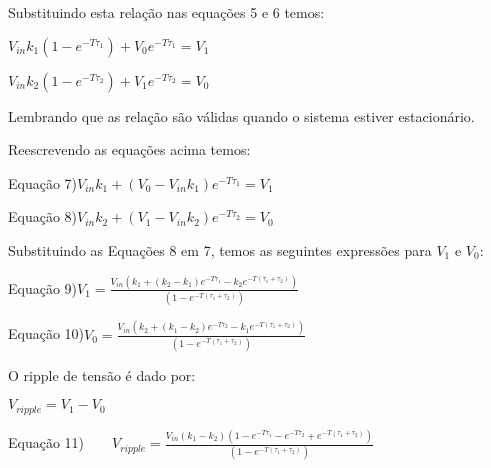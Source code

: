 \documentclass{article}
\begin{document}
Substituindo esta rela\c{c}\~{a}o nas equa\c{c}\~{o}es 5 e 6 temos:

\vspace{1pt}

$V_{in}k_{1}\left( 1-e^{-T\tau _{1}}\right) +V_{0}e^{-T\tau _{1}}=V_{1\text{ 
}}$

$V_{in}k_{2}\left( 1-e^{-T\tau _{2}}\right) +V_{1}e^{-T\tau _{2}}=V_{0\text{ 
}}$

\vspace{1pt}

Lembrando que as rela\c{c}\~{a}o s\~{a}o v\'{a}lidas quando o sistema
estiver estacion\'{a}rio.

Reescrevendo as equa\c{c}\~{o}es acima temos:

Equa\c{c}\~{a}o 7)\qquad $V_{in}k_{1}+\left( V_{0}-V_{in}k_{1}\right)
e^{-T\tau _{1}}=V_{1\text{ }}$

\qquad \qquad \qquad 

Equa\c{c}\~{a}o 8)\qquad $V_{in}k_{2}+\left( V_{1}-V_{in}k_{2}\right)
e^{-T\tau _{2}}=V_{0\text{ }}$

\vspace{1pt}

Substituindo as Equa\c{c}\~{o}es 8 em 7, temos as seguintes express\~{o}es
para $V_{1}$ e $V_{0}$:

\vspace{1pt}

Equa\c{c}\~{a}o 9)\qquad $V_{1}=\frac{V_{in}\left( k_{1}+\left(
k_{2}-k_{1}\right) e^{-T\tau _{1}}-k_{2}e^{-T\left( \tau _{1}+\tau
_{2}\right) }\right) }{\left( 1-e^{-T\left( \tau _{1}+\tau _{2}\right)
}\right) }$

\vspace{1pt}

Equa\c{c}\~{a}o 10)\qquad $V_{0}=\frac{V_{in}\left( k_{2}+\left(
k_{1}-k_{2}\right) e^{-T\tau _{2}}-k_{1}e^{-T\left( \tau _{1}+\tau
_{2}\right) }\right) }{\left( 1-e^{-T\left( \tau _{1}+\tau _{2}\right)
}\right) }$

\vspace{1pt}

O ripple de tens\~{a}o \'{e} dado por:

\vspace{1pt}

$V_{ripple}=V_{1}-V_{0}$

Equa\c{c}\~{a}o 11)$\qquad V_{ripple}=\frac{V_{in}\left( k_{1}-k_{2}\right)
\left( 1-e^{-T\tau _{1}}-e^{-T\tau _{2}}+e^{-T\left( \tau _{1}+\tau
_{2}\right) }\right) }{\left( 1-e^{-T\left( \tau _{1}+\tau _{2}\right)
}\right) }$
\end{document}

